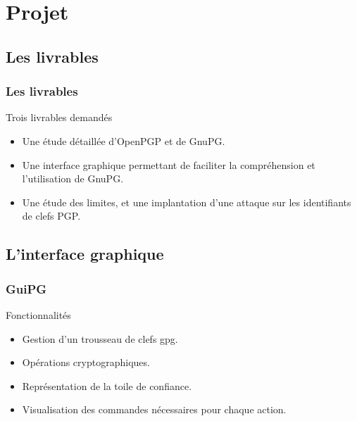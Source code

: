 \section{Projet}
\subsection{Les livrables}
\begin{frame}
    \frametitle{\color{white}Les livrables}
    \begin{block}{Trois livrables demandés}
      \begin{itemize}
         \item Une étude détaillée d'OpenPGP et de GnuPG.
         \item Une interface graphique permettant de faciliter la compréhension et l'utilisation de GnuPG.
         \item Une étude des limites, et une implantation d'une attaque sur les identifiants de clefs PGP.
       \end{itemize} 
    \end{block}
\end{frame}

\subsection{L'interface graphique}
\begin{frame}
    \frametitle{\color{white}GuiPG}
    \begin{block}{Fonctionnalités}
      \begin{itemize}
        \item Gestion d'un trousseau de clefs gpg.
        \item Opérations cryptographiques.
        \item Représentation de la toile de confiance.
        \item Visualisation des commandes nécessaires pour chaque action.
      \end{itemize}
    \end{block}
\end{frame}


